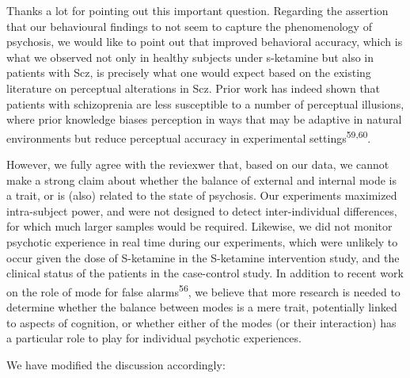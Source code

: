 \documentclass[
]{article}
\begin{document}
Thanks a lot for pointing out this important question. Regarding the
assertion that our behavioural findings to not seem to capture the
phenomenology of psychosis, we would like to point out that improved
behavioral accuracy, which is what we observed not only in healthy
subjects under s-ketamine but also in patients with Scz, is precisely
what one would expect based on the existing literature on perceptual
alterations in Scz. Prior work has indeed shown that patients with
schizoprenia are less susceptible to a number of perceptual illusions,
where prior knowledge biases perception in ways that may be adaptive in
natural environments but reduce perceptual accuracy in experimental
settings\textsuperscript{59,60}.

However, we fully agree with the reviexwer that, based on our data, we
cannot make a strong claim about whether the balance of external and
internal mode is a trait, or is (also) related to the state of
psychosis. Our experiments maximized intra-subject power, and were not
designed to detect inter-individual differences, for which much larger
samples would be required. Likewise, we did not monitor psychotic
experience in real time during our experiments, which were unlikely to
occur given the dose of S-ketamine in the S-ketamine intervention study,
and the clinical status of the patients in the case-control study. In
addition to recent work on the role of mode for false
alarms\textsuperscript{56}, we believe that more research is needed to
determine whether the balance between modes is a mere trait, potentially
linked to aspects of cognition, or whether either of the modes (or their
interaction) has a particular role to play for individual psychotic
experiences.

We have modified the discussion accordingly:
\end{document}
